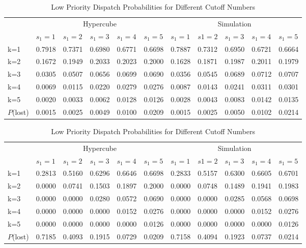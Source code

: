 \documentclass{article}
\begin{document}
\begin{table}
\centering
\begin{tabular}{| l || l l l l l | l l l l l |}
\hline
\hline
& \multicolumn{5}{c|}{Hypercube} & \multicolumn{5}{c|}{Simulation}\\
& $s_1=1$ & $ s_1= 2$ & $s_1=3$ & $s_1=4$ & $s_1=5$& $s_1=1$ & $ s1= 2$ & $s_1=3$ & $s_1=4$ & $s_1=5$  \\
 \hline
k=1 &0.7918&0.7371&0.6980&0.6771&0.6698&0.7887&0.7312&0.6950&0.6721&0.6664  \\
k=2 &0.1672&0.1949&0.2033&0.2023&0.2000&0.1628&0.1871&0.1987&0.2011&0.1979  \\
k=3 &0.0305&0.0507&0.0656&0.0699&0.0690&0.0356&0.0545&0.0689&0.0712&0.0707  \\
k=4 &0.0069&0.0115&0.0220&0.0279&0.0276&0.0087&0.0143&0.0241&0.0311&0.0301  \\
k=5 &0.0020&0.0033&0.0062&0.0128&0.0126&0.0028&0.0043&0.0083&0.0142&0.0135  \\
\hline
$P$(lost) &0.0015&0.0025&0.0049&0.0100&0.0209&0.0015&0.0025&0.0050&0.0102&0.0214 \\
\hline
\end{tabular}
\label{table:dispatchprobH}
\caption{High Priority Dispatch Probabilities for Different Cutoff Numbers}

\vspace{10mm}

\centering
\begin{tabular}{| l || l l l l l | l l l l l |}
\hline
\hline
& \multicolumn{5}{c|}{Hypercube} & \multicolumn{5}{c|}{Simulation}\\
& $s_1=1$ & $ s_1= 2$ & $s_1=3$ & $s_1=4$ & $s_1=5$& $s_1=1$ & $ s1= 2$ & $s_1=3$ & $s_1=4$ & $s_1=5$  \\ 
\hline
k=1 &0.2813&0.5160&0.6296&0.6646&0.6698&0.2833&0.5157&0.6300&0.6605&0.6701  \\
k=2 &0.0000&0.0741&0.1503&0.1897&0.2000&0.0000&0.0748&0.1489&0.1941&0.1983  \\
k=3 &0.0000&0.0000&0.0280&0.0572&0.0690&0.0000&0.0000&0.0285&0.0568&0.0698  \\
k=4 &0.0000&0.0000&0.0000&0.0152&0.0276&0.0000&0.0000&0.0000&0.0152&0.0276  \\
k=5 &0.0000&0.0000&0.0000&0.0000&0.0126&0.0000&0.0000&0.0000&0.0000&0.0126  \\
\hline
$P$(lost) &0.7185&0.4093&0.1915&0.0729&0.0209&0.7158&0.4094&0.1923&0.0737&0.0214 \\
\hline
\end{tabular}
\label{table:dispatchprobL}
\caption{Low Priority Dispatch Probabilities for Different Cutoff Numbers}


\end{table}
\end{document}
